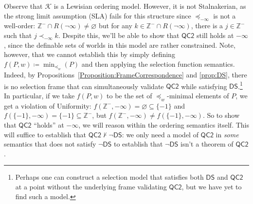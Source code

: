 \documentclass[12pt]{article}
\newcommand{\would}{\mathbin{>}}
\newcommand{\then}{\mathbin{\supset}}
\begin{document}
Observe that $\mathcal{K}$ is a Lewisian ordering model. 
However, it is not Stalnakerian, as the strong limit assumption (SLA) fails for this structure since $\preceq_{-\infty}$ is not a well-order: $\mathbb{Z}^{-}\cap{R(\neg\infty)}\neq\varnothing$ but for any $k\in \mathbb{Z}^{-}\cap{R(\neg\infty)}$, there is a $j\in \mathbb{Z}^{-}$ such that $j\prec_{-\infty}k$.
Despite this, we'll be able to show that $\mathsf{QC2}$ still holds at $-\infty$, since the definable sets of worlds in this model are rather constrained. 
Note, however, that we cannot establish this by simply defining $f(P,w) \coloneqq \min_{\preceq_w}(P)$ and then applying the selection function semantics. 
Indeed, by Propositions~\ref{Proposition:FrameCorrespondence} and \ref{prop:DS}, there is no selection frame that can simultaneously validate $\mathsf{QC2}$ while satisfying $\mathsf{DS}$.\footnote{Perhaps one can construct a selection model that satisfies both $\mathsf{DS}$ and $\mathsf{QC2}$ at a point without the underlying frame validating $\mathsf{QC2}$, but we have yet to find such a model.} 
In particular, if we take $f(P,w)$ to be the set of $\preceq_w$-minimal elements of $P$, we get a violation of Uniformity: $f(\mathbb{Z}^-,-\infty) = \varnothing \subseteq \{-1\}$ and $f(\{-1\},-\infty) = \{-1\} \subseteq \mathbb{Z}^-$, but $f(\mathbb{Z}^-,-\infty) \neq f(\{-1\},-\infty)$. 
So to show that $\mathsf{QC2}$ ``holds'' at $-\infty$, we will reason within the ordering semantics itself. 
This will suffice to establish that $\mathsf{QC2} \nvdash \neg\mathsf{DS}$: we only need a model of $\mathsf{QC2}$ in \emph{some} semantics that does not satisfy $\neg\mathsf{DS}$ to establish that $\neg\mathsf{DS}$ isn't a theorem of $\mathsf{QC2}$. 
\end{document}
